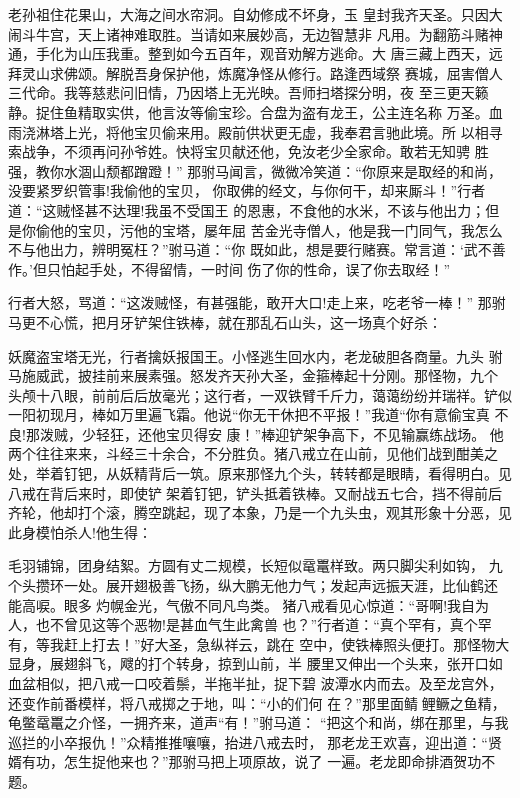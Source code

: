 老孙祖住花果山，大海之间水帘洞。自幼修成不坏身，玉
皇封我齐天圣。只因大闹斗牛宫，天上诸神难取胜。当请如来展妙高，无边智慧非
凡用。为翻筋斗赌神通，手化为山压我重。整到如今五百年，观音劝解方逃命。大
唐三藏上西天，远拜灵山求佛颂。解脱吾身保护他，炼魔净怪从修行。路逢西域祭
赛城，屈害僧人三代命。我等慈悲问旧情，乃因塔上无光映。吾师扫塔探分明，夜
至三更天籁静。捉住鱼精取实供，他言汝等偷宝珍。合盘为盗有龙王，公主连名称
万圣。血雨浇淋塔上光，将他宝贝偷来用。殿前供状更无虚，我奉君言驰此境。所
以相寻索战争，不须再问孙爷姓。快将宝贝献还他，免汝老少全家命。敢若无知骋
胜强，教你水涸山颓都蹭蹬！”
那驸马闻言，微微冷笑道：“你原来是取经的和尚，没要紧罗织管事!我偷他的宝贝，
你取佛的经文，与你何干，却来厮斗！”行者道：“这贼怪甚不达理!我虽不受国王
的恩惠，不食他的水米，不该与他出力；但是你偷他的宝贝，污他的宝塔，屡年屈
苦金光寺僧人，他是我一门同气，我怎么不与他出力，辨明冤枉？”驸马道：“你
既如此，想是要行赌赛。常言道：‘武不善作。’但只怕起手处，不得留情，一时间
伤了你的性命，误了你去取经！”

行者大怒，骂道：“这泼贼怪，有甚强能，敢开大口!走上来，吃老爷一棒！”
那驸马更不心慌，把月牙铲架住铁棒，就在那乱石山头，这一场真个好杀：

妖魔盗宝塔无光，行者擒妖报国王。小怪逃生回水内，老龙破胆各商量。九头
驸马施威武，披挂前来展素强。怒发齐天孙大圣，金箍棒起十分刚。那怪物，九个
头颅十八眼，前前后后放毫光；这行者，一双铁臂千斤力，蔼蔼纷纷并瑞祥。铲似
一阳初现月，棒如万里遍飞霜。他说“你无干休把不平报！”我道“你有意偷宝真
不良!那泼贼，少轻狂，还他宝贝得安
康！”棒迎铲架争高下，不见输赢练战场。
他两个往往来来，斗经三十余合，不分胜负。猪八戒立在山前，见他们战到酣美之
处，举着钉钯，从妖精背后一筑。原来那怪九个头，转转都是眼睛，看得明白。见
八戒在背后来时，即使铲架着钉钯，铲头抵着铁棒。又耐战五七合，挡不得前后
齐轮，他却打个滚，腾空跳起，现了本象，乃是一个九头虫，观其形象十分恶，见
此身模怕杀人!他生得：

毛羽铺锦，团身结絮。方圆有丈二规模，长短似鼋鼍样致。两只脚尖利如钩，
九个头攒环一处。展开翅极善飞扬，纵大鹏无他力气；发起声远振天涯，比仙鹤还
能高唳。眼多灼幌金光，气傲不同凡鸟类。
猪八戒看见心惊道：“哥啊!我自为人，也不曾见这等个恶物!是甚血气生此禽兽
也？”行者道：“真个罕有，真个罕有，等我赶上打去！”好大圣，急纵祥云，跳在
空中，使铁棒照头便打。那怪物大显身，展翅斜飞，飕的打个转身，掠到山前，半
腰里又伸出一个头来，张开口如血盆相似，把八戒一口咬着鬃，半拖半扯，捉下碧
波潭水内而去。及至龙宫外，还变作前番模样，将八戒掷之于地，叫：“小的们何
在？”那里面鲭鲤鳜之鱼精，龟鳖鼋鼍之介怪，一拥齐来，道声“有！”驸马道：
“把这个和尚，绑在那里，与我巡拦的小卒报仇！”众精推推嚷嚷，抬进八戒去时，
那老龙王欢喜，迎出道：“贤婿有功，怎生捉他来也？”那驸马把上项原故，说了
一遍。老龙即命排酒贺功不题。

